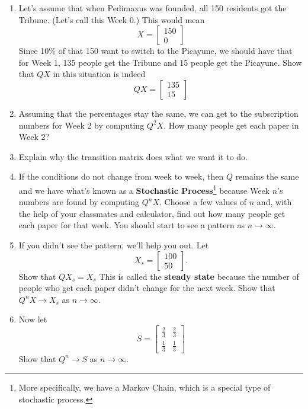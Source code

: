 \documentclass{ximera}
\begin{document}
\begin{enumerate}
\setcounter{enumi}{\value{HW}}

\item \label{MCfirst} Let's assume that when Pedimaxus was founded, all 150 residents got the Tribune.  (Let's call this Week 0.) This would mean \[X = \left[ \begin{array}{r} 150 \\ 0 \end{array} \right]\] Since 10\% of that 150 want to switch to the Picayune, we should have that for Week 1, 135 people get the Tribune and 15 people get the Picayune.  Show that $QX$ in this situation is indeed \[QX = \left[ \begin{array}{r} 135 \\ 15 \end{array} \right]\]

\item Assuming that the percentages stay the same, we can get to the subscription numbers for Week 2 by computing $Q^{2}X$. How many people get each paper in Week 2?

\item Explain why the transition matrix does what we want it to do.

\item If the conditions do not change from week to week, then $Q$ remains the same and we have what's known as a   {\bf Stochastic Process}\footnote{More specifically, we have a Markov Chain, which is a special type of stochastic process.} because Week $n$'s numbers are found by computing $Q^{n}X$.  Choose a few values of $n$ and, with the help of your classmates and calculator, find out how many people get each paper for that week.  You should start to see a pattern as $n \rightarrow \infty$.

\item If you didn't see the pattern, we'll help you out.  Let \[X_{s} = \left[ \begin{array}{r} 100 \\ 50 \end{array} \right].\]  Show that $QX_{s} = X_{s}$  This is called the {\bf steady state}  because the number of people who get each paper didn't change for the next week.  Show that $Q^{n}X \rightarrow X_{s}$ as $n \rightarrow \infty$. 

\item Now let \[S = \left[ \begin{array}{rr} \frac{2}{3} & \frac{2}{3} \\ [3pt] \frac{1}{3} & \frac{1}{3} \end{array} \right]\]  Show that $Q^{n} \rightarrow S$ as $n \rightarrow \infty$.  


\end{enumerate}
\end{document}
